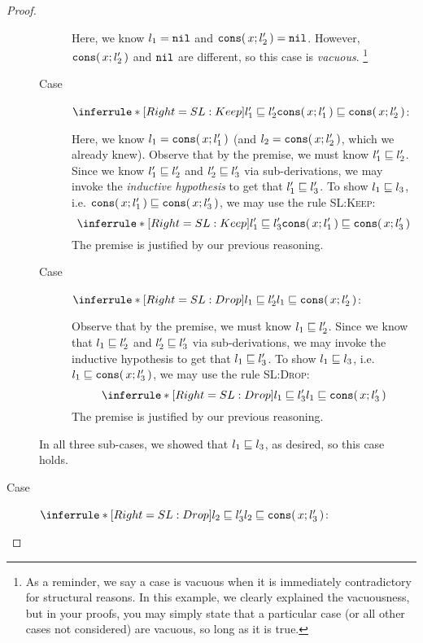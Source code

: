 \documentclass[11pt]{article}
\begin{document}
\begin{proof}
\begin{description}
\begin{description}
          Here, we know $l_1 = \mathtt{nil}$ and ${\mathtt{cons}}\mathtt{(}\,x; l_2'\,\mathtt{)} = \mathtt{nil}$.
          However, ${\mathtt{cons}}\mathtt{(}\,x; l_2'\,\mathtt{)}$ and $\mathtt{nil}$ are different, so this case is \emph{vacuous}.%
          \footnote{As a reminder, we say a case is vacuous when it is immediately contradictory for structural reasons. In this example, we clearly explained the vacuousness, but in your proofs, you may simply state that a particular case (or all other cases not considered) are vacuous, so long as it is true.}

        \item[Case]
          $\Infer[SL:Keep]
            {\IsSublist{l_1'}{l_2'}}
            {\IsSublist{\ConsList{x}{l_1'}}{\ConsList{x}{l_2'}}}$:%

          Here, we know $l_1 = {\mathtt{cons}}\mathtt{(}\,x; l_1'\,\mathtt{)}$ (and $l_2 = {\mathtt{cons}}\mathtt{(}\,x; l_2'\,\mathtt{)}$, which we already knew).
          Observe that by the premise, we must know ${l_1'} \sqsubseteq {l_2'}$.
          Since we know ${l_1'} \sqsubseteq {l_2'}$ and ${l_2'} \sqsubseteq {l_3'}$ via sub-derivations, we may invoke the \emph{inductive hypothesis} to get that ${l_1'} \sqsubseteq {l_3'}$.
          To show ${l_1} \sqsubseteq {l_3}$, i.e. ${{\mathtt{cons}}\mathtt{(}\,x; l_1'\,\mathtt{)}} \sqsubseteq {{\ensuremath{\mathtt{cons}}}\ensuremath{\mathtt{(}}\,x; l_3'\,\ensuremath{\mathtt{)}}}$, we may use the rule \textsc{SL:Keep}:
          \[
            \Infer[SL:Keep]
              {\IsSublist{l_1'}{l_3'}}
              {\IsSublist{\ConsList{x}{l_1'}}{\ConsList{x}{l_3'}}}
          \]
          The premise is justified by our previous reasoning.

        \item[Case]
          $\Infer[SL:Drop]
            {\IsSublist{l_1}{l_2'}}
            {\IsSublist{l_1}{\ConsList{x}{l_2'}}}$:

          Observe that by the premise, we must know ${l_1} \sqsubseteq {l_2'}$.
          Since we know that ${l_1} \sqsubseteq {l_2'}$ and ${l_2'} \sqsubseteq {l_3'}$ via sub-derivations, we may invoke the inductive hypothesis to get that ${l_1} \sqsubseteq {l_3'}$.
          To show ${l_1} \sqsubseteq {l_3}$, i.e. ${l_1} \sqsubseteq {{\ensuremath{\mathtt{cons}}}\ensuremath{\mathtt{(}}\,x; l_3'\,\ensuremath{\mathtt{)}}}$, we may use the rule \textsc{SL:Drop}:
          \[
            \Infer[SL:Drop]
              {\IsSublist{l_1}{l_3'}}
              {\IsSublist{l_1}{\ConsList{x}{l_3'}}}
          \]
          The premise is justified by our previous reasoning.
      \end{description}

      In all three sub-cases, we showed that ${l_1} \sqsubseteq {l_3}$, as desired, so this case holds.

    \item[Case]
      $\Infer[SL:Drop]
        {\IsSublist{l_2}{l_3'}}
        {\IsSublist{l_2}{\ConsList{x}{l_3'}}}$:


\end{description}
\end{proof}
\end{document}

